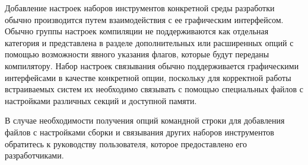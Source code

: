 Добавление настроек наборов инструментов конкретной среды разработки
обычно производится путем взаимодействия с ее графическим интерфейсом.
Обычно группы настроек компиляции не поддерживаются как отдельная категория и представлена в разделе дополнительных или расширенных
опций с помощью возможности явного указания флагов, которые будут переданы
компилятору.
Набор настроек связывания обычно поддерживается графическими интерфейсами
в качестве конкретной опции, поскольку для корректной работы встраиваемых систем
их необходимо связывать с помощью специальных файлов с настройками различных секций
и доступной памяти.

В случае необходимости получения опций командной строки
для добавления файлов с настройками сборки и связывания
других наборов инструментов
обратитесь к руководству пользователя, которое предоставлено его разработчиками.
